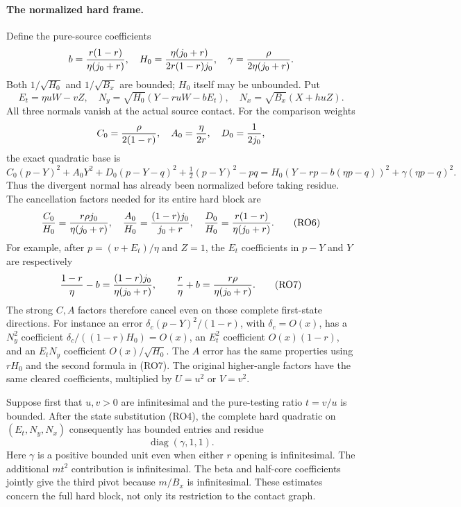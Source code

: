 \paragraph{The normalized hard frame.}
Define the pure-source coefficients
\[
 b={r(1-r)\over\eta(j_0+r)},\quad
 H_0={\eta(j_0+r)\over2r(1-r)j_0},\quad
 \gamma={\rho\over2\eta(j_0+r)}.
\]
Both $1/\sqrt{H_0}$ and $1/\sqrt{B_x}$ are bounded; $H_0$
itself may be unbounded. Put
\[
 E_t=\eta uW-vZ,\quad
 N_y=\sqrt{H_0}(Y-ruW-bE_t),\quad
 N_x=\sqrt{B_x}(X+huZ).                              \tag{RO4}
\]
All three normals vanish at the actual source contact. For the
comparison weights
\[
 C_0={\rho\over2(1-r)},\quad A_0={\eta\over2r},\quad
 D_0={1\over2j_0},
\]
the exact quadratic base is
\[
 C_0(p-Y)^2+A_0Y^2+D_0(p-Y-q)^2+\tfrac12(p-Y)^2-pq
       =H_0(Y-rp-b(\eta p-q))^2+\gamma(\eta p-q)^2.  \tag{RO5}
\]
Thus the divergent normal has already been normalized before taking
residue. The cancellation factors needed for its entire hard block are
\[
 {C_0\over H_0}={r\rho j_0\over\eta(j_0+r)},\quad
 {A_0\over H_0}={(1-r)j_0\over j_0+r},\quad
 {D_0\over H_0}={r(1-r)\over\eta(j_0+r)}.             \tag{RO6}
\]
For example, after $p=(v+E_t)/\eta$ and $Z=1$, the $E_t$
coefficients in $p-Y$ and $Y$ are respectively
\[
 {1-r\over\eta}-b={(1-r)j_0\over\eta(j_0+r)},\qquad
 {r\over\eta}+b={r\rho\over\eta(j_0+r)}.            \tag{RO7}
\]
The strong $C,A$ factors therefore cancel even on those complete
first-state directions. For instance an error
$\delta_c(p-Y)^2/(1-r)$, with $\delta_c=O(x)$, has a
$N_y^2$ coefficient $\delta_c/((1-r)H_0)=O(x)$,
an $E_t^2$ coefficient $O(x)(1-r)$, and an $E_tN_y$
coefficient $O(x)/\sqrt{H_0}$. The $A$ error has the same
properties using $rH_0$ and the second formula in (RO7).
The original higher-angle factors have the same cleared coefficients,
multiplied by $U=u^2$ or $V=v^2$.

Suppose first that $u,v>0$ are infinitesimal and the pure-testing
ratio $t=v/u$ is bounded. After the state substitution (RO4), the
complete hard quadratic on $(E_t,N_y,N_x)$ consequently has bounded
entries and residue
\[
                         \operatorname{diag}(\gamma,1,1).       \tag{RO8}
\]
Here $\gamma$ is a positive bounded unit even when either $r$
opening is infinitesimal. The additional $m t^2$ contribution is
infinitesimal. The beta and half-core coefficients jointly give the
third pivot because $m/B_x$ is infinitesimal. These estimates concern
the full hard block, not only its restriction to the contact graph.

